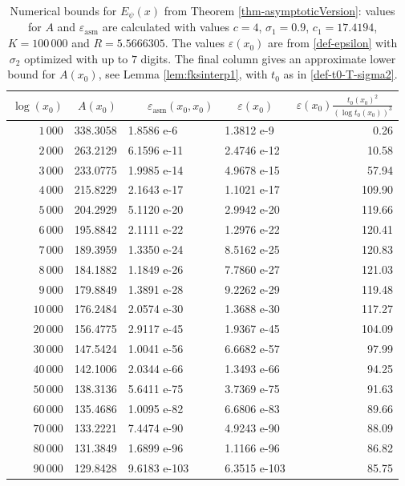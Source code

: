 \documentclass[10pt]{amsart}
\newcommand{\s}{\sigma}
\theoremstyle{definition}
\numberwithin{equation}{section}
\begin{document}
\begin{table}[h!]
\caption{Numerical bounds for $E_{\psi}(x)$ from Theorem \ref{thm-asymptoticVersion}: values for $A$ and $\varepsilon_{\text{asm}}$ are calculated 
with values $c = 4$, $\sigma_1 = 0.9$, $c_1=17.4194$, $K=100\,000$ and $R  = 5.5666305$. 
The values $\varepsilon(x_0)$ are from \eqref{def-epsilon} with $\s_2$ optimized with up to $7$ digits.
The final column gives an approximate lower bound for $A(x_0)$, see Lemma \ref{lem:fksinterp1}, with $t_0$ as in \eqref{def-t0-T-sigma2}. 
}\label{TableResultsAsympt}
\begin{tabular}{|r|r|l|l|r|}
\hline
$\log(x_0)$ & $A(x_0)$ &\ \ \  $\varepsilon_{\text{asm}}(x_0,x_0)$ & \ \qquad\  $\varepsilon(x_0)$ & $ \varepsilon(x_0)  \tfrac{t_0(x_0)^2}{(\log t_0(x_0))^3}$ \\
\hline
$1\,000$ & 338.3058 & 1.8586 e-6 & 1.3812 e-9 & 0.26 \\
$2\,000$ & 263.2129 & 6.1596 e-11 & 2.4746 e-12 & 10.58 \\
$3\,000$ & 233.0775 & 1.9985 e-14 & 4.9678 e-15 & 57.94 \\
$4\,000$ & 215.8229 & 2.1643 e-17 & 1.1021 e-17 & 109.90 \\
$5\,000$ & 204.2929 & 5.1120 e-20 & 2.9942 e-20 & 119.66 \\
$6\,000$ & 195.8842 & 2.1111 e-22 & 1.2976 e-22 & 120.41 \\
$7\,000$ & 189.3959 & 1.3350 e-24 & 8.5162 e-25 & 120.83 \\
$8\,000$ & 184.1882 & 1.1849 e-26 & 7.7860 e-27 & 121.03 \\
$9\,000$ & 179.8849 & 1.3891 e-28 & 9.2262 e-29 & 119.48 \\
$10\,000$ & 176.2484 & 2.0574 e-30 & 1.3688 e-30 & 117.27 \\
$20\,000$ & 156.4775 & 2.9117 e-45 & 1.9367 e-45 & 104.09 \\
$30\,000$ & 147.5424 & 1.0041 e-56 & 6.6682 e-57 & 97.99 \\
$40\,000$ & 142.1006 & 2.0344 e-66 & 1.3493 e-66 & 94.25 \\
$50\,000$ & 138.3136 & 5.6411 e-75 & 3.7369 e-75 & 91.63 \\
$60\,000$ & 135.4686 & 1.0095 e-82 & 6.6806 e-83 & 89.66 \\
$70\,000$ & 133.2221 & 7.4474 e-90 & 4.9243 e-90 & 88.09 \\
$80\,000$ & 131.3849 & 1.6899 e-96 & 1.1166 e-96 & 86.82 \\
$90\,000$ & 129.8428 & 9.6183 e-103 & 6.3515 e-103 & 85.75 \\

\end{tabular}
\end{table}
\end{document}
